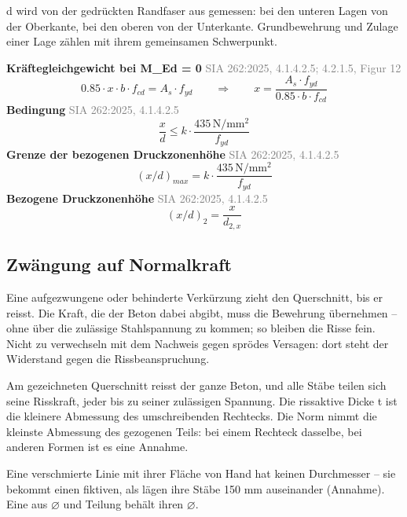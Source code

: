 \documentclass[11pt,a4paper]{article}
\newcommand{\normref}[1]{{\small\textcolor{gray}{#1}}}
\begin{document}
d wird von der gedrückten Randfaser aus gemessen: bei den unteren Lagen von der Oberkante, bei den oberen von der Unterkante. Grundbewehrung und Zulage einer Lage zählen mit ihrem gemeinsamen Schwerpunkt.

\noindent\textbf{Kräftegleichgewicht bei M\_Ed = 0} \hfill \normref{SIA 262:2025, 4.1.4.2.5; 4.2.1.5, Figur 12}
\begin{equation*}
0.85 \cdot x \cdot b \cdot f_{cd} = A_s \cdot f_{yd} \qquad \Rightarrow \qquad x = \frac{A_s \cdot f_{yd}}{0.85 \cdot b \cdot f_{cd}}
\end{equation*}
\noindent\textbf{Bedingung} \hfill \normref{SIA 262:2025, 4.1.4.2.5}
\begin{equation*}
\frac{x}{d} \le k \cdot \frac{435\,\mathrm{N/mm^2}}{f_{yd}}
\end{equation*}
\noindent\textbf{Grenze der bezogenen Druckzonenhöhe} \hfill \normref{SIA 262:2025, 4.1.4.2.5}
\begin{equation*}
\left(x/d\right)_{max} = k \cdot \frac{435\,\mathrm{N/mm^2}}{f_{yd}}
\end{equation*}
\noindent\textbf{Bezogene Druckzonenhöhe} \hfill \normref{SIA 262:2025, 4.1.4.2.5}
\begin{equation*}
\left(x/d\right)_{2} = \frac{x}{d_{2,x}}
\end{equation*}
\subsection{Zwängung auf Normalkraft}
Eine aufgezwungene oder behinderte Verkürzung zieht den Querschnitt, bis er reisst. Die Kraft, die der Beton dabei abgibt, muss die Bewehrung übernehmen – ohne über die zulässige Stahlspannung zu kommen; so bleiben die Risse fein. Nicht zu verwechseln mit dem Nachweis gegen sprödes Versagen: dort steht der Widerstand gegen die Rissbeanspruchung.

Am gezeichneten Querschnitt reisst der ganze Beton, und alle Stäbe teilen sich seine Risskraft, jeder bis zu seiner zulässigen Spannung. Die rissaktive Dicke t ist die kleinere Abmessung des umschreibenden Rechtecks. Die Norm nimmt die kleinste Abmessung des gezogenen Teils: bei einem Rechteck dasselbe, bei anderen Formen ist es eine Annahme.

Eine verschmierte Linie mit ihrer Fläche von Hand hat keinen Durchmesser – sie bekommt einen fiktiven, als lägen ihre Stäbe 150 mm auseinander (Annahme). Eine aus ⌀ und Teilung behält ihren ⌀.
\end{document}
